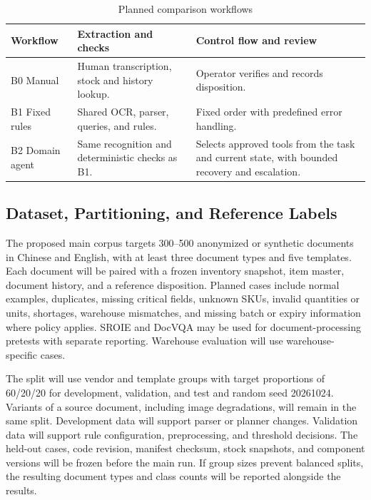 \documentclass[conference]{IEEEtran}
\begin{document}
\begin{table}[t]
\caption{Planned comparison workflows}
\label{tab:baselines}
\centering
\footnotesize
\renewcommand{\arraystretch}{1.18}
\begin{tabularx}{\columnwidth}{@{}>{\raggedright\arraybackslash}p{}YY@{}}
\hline
\textbf{Workflow} & \textbf{Extraction and checks} & \textbf{Control flow and review}\\
\hline
B0 Manual & Human transcription, stock and history lookup. & Operator verifies and records disposition.\\
B1 Fixed rules & Shared OCR, parser, queries, and rules. & Fixed order with predefined error handling.\\
B2 Domain agent & Same recognition and deterministic checks as B1. & Selects approved tools from the task and current state, with bounded recovery and escalation.\\
\hline
\end{tabularx}
\end{table}

\subsection{Dataset, Partitioning, and Reference Labels}
The proposed main corpus targets 300--500 anonymized or synthetic documents in Chinese and English, with at least three document types and five templates. Each document will be paired with a frozen inventory snapshot, item master, document history, and a reference disposition. Planned cases include normal examples, duplicates, missing critical fields, unknown SKUs, invalid quantities or units, shortages, warehouse mismatches, and missing batch or expiry information where policy applies. SROIE and DocVQA may be used for document-processing pretests with separate reporting. Warehouse evaluation will use warehouse-specific cases.

The split will use vendor and template groups with target proportions of 60/20/20 for development, validation, and test and random seed 20261024. Variants of a source document, including image degradations, will remain in the same split. Development data will support parser or planner changes. Validation data will support rule configuration, preprocessing, and threshold decisions. The held-out cases, code revision, manifest checksum, stock snapshots, and component versions will be frozen before the main run. If group sizes prevent balanced splits, the resulting document types and class counts will be reported alongside the results.
\end{document}

